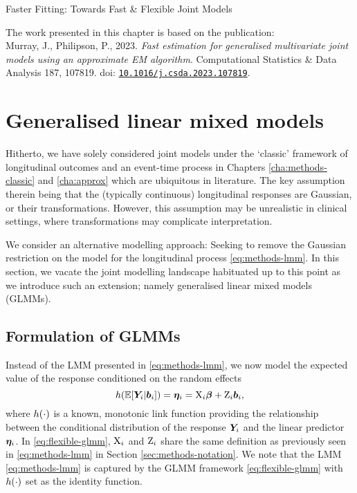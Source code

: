 \begin{chapter}{\label{cha:flexible}Faster Fitting: Towards Fast \& Flexible Joint Models}
\vfill
\begin{center}
    \begin{bluebox}
    The work presented in this chapter is based on the publication:\\Murray, J., Philipson, P., 2023. \textit{Fast estimation for generalised multivariate joint models using an approximate EM algorithm}. Computational Statistics \& Data Analysis 187, 107819. doi: \href{https://doi.org/10.1016/j.csda.2023.107819}{\tt{10.1016/j.csda.2023.107819}}.
    \end{bluebox}
\end{center}
\vfill
\clearpage

\section{Generalised linear mixed models}\label{sec:flexible-glmm-overview}
 Hitherto, we have solely considered joint models under the `classic' framework of longitudinal outcomes and an event-time process in Chapters \ref{cha:methods-classic} and \ref{cha:approx} which are ubiquitous in literature. The key assumption therein being that the (typically continuous) longitudinal responses are Gaussian, or their transformations. However, this assumption may be unrealistic in clinical settings, where transformations may complicate interpretation. 
 
 We consider an alternative modelling approach: Seeking to remove the Gaussian restriction on the model for the longitudinal process \eqref{eq:methods-lmm}. In this section, we vacate the joint modelling landscape habituated up to this point as we introduce such an extension; namely generalised linear mixed models (GLMMs). 
 
 \subsection{Formulation of GLMMs}\label{sec:flexible-glmm-formulation}
 Instead of the LMM presented in \eqref{eq:methods-lmm}, we now model the expected value of the response conditioned on the random effects
 \begin{equation}
     h\!\left(\operatorname{\mathbb{E}}\!\left[\bm{Y}_i|\bm{b}_i\right]\right) = \bm{\eta}_i = \mathrm{X}_i\bm{\beta}+\mathrm{Z}_i\bm{b}_i,
 \label{eq:flexible-glmm}    
 \end{equation}
 where $h\!\left(\cdot\right)$ is a known, monotonic link function providing the relationship between the conditional distribution of the response $\bm{Y}_i$ and the linear predictor $\bm{\eta}_i$. In \eqref{eq:flexible-glmm}, $\mathrm{X}_i$ and $\mathrm{Z}_i$ share the same definition as previously seen in \eqref{eq:methods-lmm} in Section \ref{sec:methods-notation}. We note that the LMM \eqref{eq:methods-lmm} is captured by the GLMM framework \eqref{eq:flexible-glmm} with $h\!\left(\cdot\right)$ set as the identity function.
 

\end{chapter}
